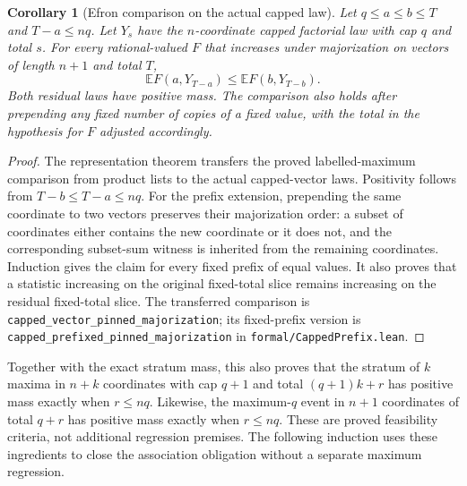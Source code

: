 \documentclass[11pt]{article}
\newtheorem{corollary}{Corollary}
\begin{document}
\begin{corollary}[Efron comparison on the actual capped law]\label{cor:leanvectorpinned}
Let $q\leq a\leq b\leq T$ and $T-a\leq nq$. Let $Y_s$ have the
$n$-coordinate capped factorial law with cap $q$ and total $s$.
For every rational-valued $F$ that increases under majorization on
vectors of length $n+1$ and total $T$,
\[
 \mathbb E F(a,Y_{T-a})\leq \mathbb E F(b,Y_{T-b}).
\]
Both residual laws have positive mass. The comparison also holds after
prepending any fixed number of copies of a fixed value, with the total
in the hypothesis for $F$ adjusted accordingly.
\end{corollary}
\begin{proof}
The representation theorem transfers the proved labelled-maximum
comparison from product lists to the actual capped-vector laws.
Positivity follows from $T-b\leq T-a\leq nq$.
For the prefix extension, prepending the same coordinate to two vectors
preserves their majorization order: a subset of coordinates either
contains the new coordinate or it does not, and the corresponding
subset-sum witness is inherited from the remaining coordinates.
Induction gives the claim for every fixed prefix of equal values.
It also proves that a statistic increasing on the original fixed-total
slice remains increasing on the residual fixed-total slice.
The transferred comparison is
\texttt{capped\_vector\_pinned\_majorization}; its fixed-prefix version is
\texttt{capped\_prefixed\_pinned\_majorization} in
\texttt{formal/CappedPrefix.lean}.
\end{proof}

Together with the exact stratum mass, this also proves that the stratum
of $k$ maxima in $n+k$ coordinates with cap $q+1$ and total $(q+1)k+r$
has positive mass exactly when $r\leq nq$. Likewise, the maximum-$q$
event in $n+1$ coordinates of total $q+r$ has positive mass exactly when
$r\leq nq$. These are proved feasibility criteria, not additional
regression premises. The following induction uses these ingredients to
close the association obligation without a separate maximum regression.
\end{document}
